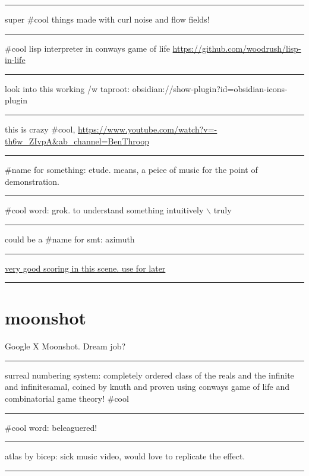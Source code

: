 \documentclass[letterpaper]{article}
\begin{document}
\noindent\rule{\textwidth}{0.5pt}

super \#cool things made with curl noise and flow fields!

\noindent\rule{\textwidth}{0.5pt}

\#cool lisp interpreter in conways game of life
\url{https://github.com/woodrush/lisp-in-life}

\noindent\rule{\textwidth}{0.5pt}

look into this working /w taproot:
obsidian://show-plugin?id=obsidian-icons-plugin

\noindent\rule{\textwidth}{0.5pt}

this is crazy \#cool,
\url{https://www.youtube.com/watch?v=-th6w\_ZIvpA\&ab\_channel=BenThroop}

\noindent\rule{\textwidth}{0.5pt}

\#name for something: etude. means, a peice of music for the point of
demonstration.

\noindent\rule{\textwidth}{0.5pt}

\#cool word: grok. to understand something intuitively $\backslash$ truly

\noindent\rule{\textwidth}{0.5pt}

could be a \#name for smt: azimuth

\noindent\rule{\textwidth}{0.5pt}

\href{https://www.youtube.com/watch?v=uvap4gEOC5I\&ab\_channel=SonyPicturesHomeEntertainment}{very
good scoring in this scene. use for later}

\noindent\rule{\textwidth}{0.5pt}

\section{moonshot}
\label{sec:orgce5402b}
Google X Moonshot. Dream job?

\noindent\rule{\textwidth}{0.5pt}

surreal numbering system: completely ordered class of the reals and the
infinite and infinitesamal, coined by knuth and proven using conways
game of life and combinatorial game theory! \#cool

\noindent\rule{\textwidth}{0.5pt}

\#cool word: beleaguered!

\noindent\rule{\textwidth}{0.5pt}

atlas by bicep: sick music video, would love to replicate the effect.

\noindent\rule{\textwidth}{0.5pt}
\end{document}
